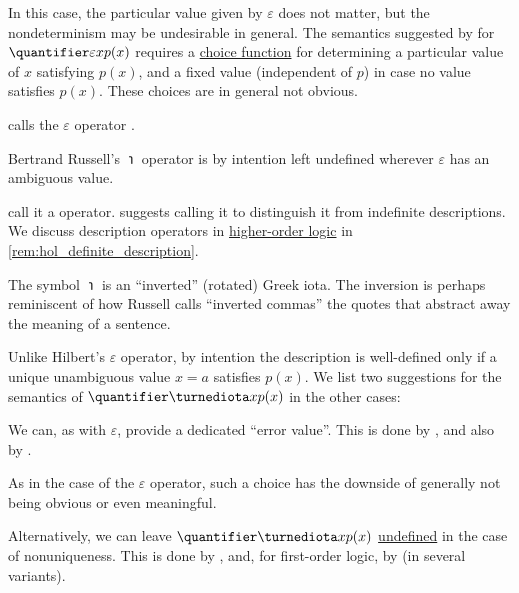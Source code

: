 \begin{concept}
\begin{thmenum}
    In this case, the particular value given by \( \varepsilon \) does not matter, but the nondeterminism may be undesirable in general. The semantics suggested by \textcite[\S 3.3]{Leisenring1969MathematicalLogic} for \( \quantifier \varepsilon x p(x) \) requires a \hyperref[def:choice_function]{choice function} for determining a particular value of \( x \) satisfying \( p(x) \), and a fixed value (independent of \( p \)) in case no value satisfies \( p(x) \). These choices are in general not obvious.

    \textcite[\S 8.3]{Farmer2008STTVirtues} calls the \( \varepsilon \) operator .

     Bertrand Russell's \( \turnediota \) operator is by intention left undefined wherever \( \varepsilon \) has an ambiguous value.

    \Textcite[30]{WhiteheadRussell1927PrincipiaMathematicaVol1} call it a  operator. \Textcite{Farmer2008STTVirtues} suggests calling it  to distinguish it from indefinite descriptions. We discuss description operators in \hyperref[def:higher_order_logic]{higher-order logic} in \cref{rem:hol_definite_description}.

    The symbol \( \turnediota \) is an \enquote{inverted} (rotated) Greek iota. The inversion is perhaps reminiscent of how Russell calls \enquote{inverted commas} the quotes that abstract away the meaning of a sentence.

    Unlike Hilbert's \( \varepsilon \) operator, by intention the description is well-defined only if a unique unambiguous value \( x = a \) satisfies \( p(x) \). We list two suggestions for the semantics of  \( \quantifier \turnediota x p(x) \) in the other cases:
    \begin{thmenum}
       We can, as with \( \varepsilon \), provide a dedicated \enquote{error value}. This is done by \textcite[\S 3.2]{Farmer2008STTVirtues}, and also by \textcite[\S 54]{Andrews2002Logic}.

      As in the case of the \( \varepsilon \) operator, such a choice has the downside of generally not being obvious or even meaningful.

       Alternatively, we can leave \( \quantifier \turnediota x p(x) \) \hyperref[con:undefinedness]{undefined} in the case of nonuniqueness. This is done by \textcite{Farmer1990PartialFunctionSTT}, and, for first-order logic, by \textcite{Hamkins2022DefiniteDescriptions} (in several variants).


\end{thmenum}
\end{thmenum}
\end{concept}
